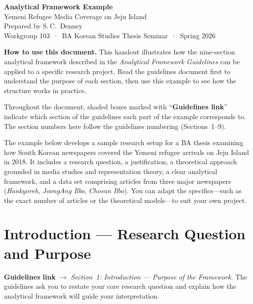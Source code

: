 \documentclass[11pt,a4paper]{article}
\begin{document}
\begin{center}
  {\LARGE\bfseries\color{leidenblu} Analytical Framework Example}\\[4pt]
  {\large\color{leidenblu} Yemeni Refugee Media Coverage on Jeju Island}\\[8pt]
  {\normalsize Prepared by S.\,C.\ Denney}\\[3pt]
  {\small Workgroup 103 \,·\, BA Korean Studies Thesis Seminar \,·\, Spring 2026}
\end{center}

\vspace{0.8em}

\begin{tipbox}
\textbf{How to use this document.} This handout illustrates how the nine-section analytical framework described in the \textit{Analytical Framework Guidelines} can be applied to a specific research project. Read the guidelines document first to understand the purpose of each section, then use this example to see how the structure works in practice.

\medskip

Throughout the document, shaded boxes marked with ``\textbf{Guidelines link}'' indicate which section of the guidelines each part of the example corresponds to. The section numbers here follow the guidelines numbering (Sections~1--9).
\end{tipbox}

\vspace{0.5em}

\noindent
The example below develops a sample research setup for a BA thesis examining how South Korean newspapers covered the Yemeni refugee arrivals on Jeju Island in 2018. It includes a research question, a justification, a theoretical approach grounded in media studies and representation theory, a clear analytical framework, and a data set comprising articles from three major newspapers (\textit{Hankyoreh}, \textit{JoongAng Ilbo}, \textit{Chosun Ilbo}). You can adapt the specifics---such as the exact number of articles or the theoretical models---to suit your own project.


\section{Introduction --- Research Question and Purpose}

\begin{crossrefbox}
\textbf{Guidelines link} $\rightarrow$ \textit{Section~1: Introduction --- Purpose of the Framework.} The guidelines ask you to restate your core research question and explain how the analytical framework will guide your interpretation.
\end{crossrefbox}
\end{document}

